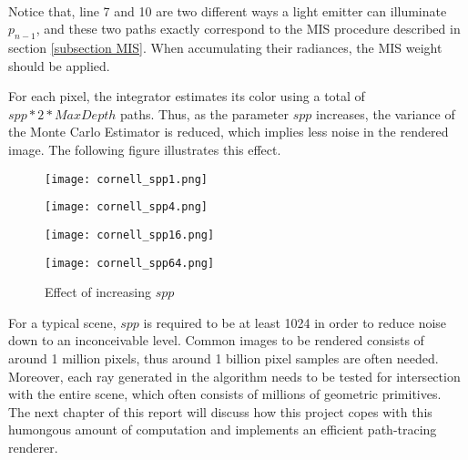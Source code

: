 ~

Notice that, line 7 and 10 are two different ways a light emitter can illuminate $p_{n-1}$, and these two paths exactly correspond to the MIS procedure described in section \ref{subsection MIS}. When accumulating their radiances, the MIS weight should be applied.


For each pixel, the integrator estimates its color using a total of $spp*2*MaxDepth$ paths. Thus, as the parameter $spp$ increases, the variance of the Monte Carlo Estimator is reduced, which implies less noise in the rendered image. The following figure illustrates this effect.


\begin{figure}[H]
    \centering
    
    \begin{minipage}[t]{.45\textwidth}
        \centering
        \vspace{0pt}
        \texttt{[image: cornell\_spp1.png]}
    \end{minipage}
    \begin{minipage}[t]{.45\textwidth}
        \centering
        \vspace{0pt}
        \texttt{[image: cornell\_spp4.png]}
    \end{minipage}

    \vspace{0.3cm}

    \begin{minipage}[t]{.45\textwidth}
        \centering
        \vspace{0pt}
        \texttt{[image: cornell\_spp16.png]}
    \end{minipage}
    \begin{minipage}[t]{.45\textwidth}
        \centering
        \vspace{0pt}
        \texttt{[image: cornell\_spp64.png]}
    \end{minipage}
    \caption{Effect of increasing $spp$}
    \label{fig spp}
\end{figure}

For a typical scene, $spp$ is required to be at least 1024 in order to reduce noise down to an inconceivable level. Common images to be rendered consists of around 1 million pixels, thus around 1 billion pixel samples are often needed. Moreover, each ray generated in the algorithm needs to be tested for intersection with the entire scene, which often consists of millions of geometric primitives. The next chapter of this report will discuss how this project copes with this humongous amount of computation and implements an efficient path-tracing renderer.

